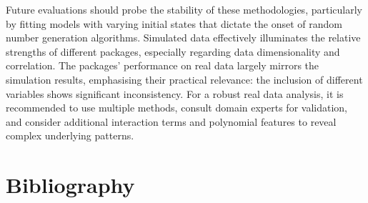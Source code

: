 \documentclass[
  11pt,
]{article}
\begin{document}
Future evaluations should probe the stability of these methodologies,
particularly by fitting models with varying initial states that dictate
the onset of random number generation algorithms. Simulated data
effectively illuminates the relative strengths of different packages,
especially regarding data dimensionality and correlation. The packages'
performance on real data largely mirrors the simulation results,
emphasising their practical relevance: the inclusion of different
variables shows significant inconsistency. For a robust real data
analysis, it is recommended to use multiple methods, consult domain
experts for validation, and consider additional interaction terms and
polynomial features to reveal complex underlying patterns.

\newpage

\section{Bibliography}
\end{document}
